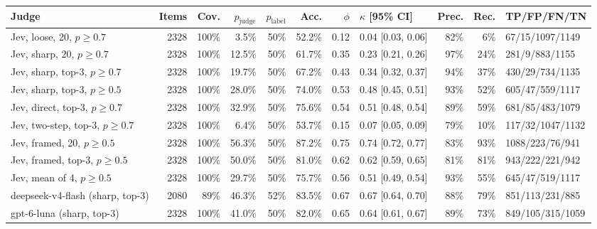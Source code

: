 \begin{tabular}{@{}lrrrrrrlrrl@{}}
\toprule
Judge & Items & Cov. & $p_{\text{judge}}$ & $p_{\text{label}}$ & Acc. & $\phi$ & $\kappa$ [95\% CI] & Prec. & Rec. & TP/FP/FN/TN \\
\midrule
Jev, loose, 20, $p \geq 0.7$ & 2328 & 100\% & 3.5\% & 50\% & 52.2\% & 0.12 & 0.04 [0.03, 0.06] & 82\% & 6\% & 67/15/1097/1149 \\
Jev, sharp, 20, $p \geq 0.7$ & 2328 & 100\% & 12.5\% & 50\% & 61.7\% & 0.35 & 0.23 [0.21, 0.26] & 97\% & 24\% & 281/9/883/1155 \\
Jev, sharp, top-3, $p \geq 0.7$ & 2328 & 100\% & 19.7\% & 50\% & 67.2\% & 0.43 & 0.34 [0.32, 0.37] & 94\% & 37\% & 430/29/734/1135 \\
Jev, sharp, top-3, $p \geq 0.5$ & 2328 & 100\% & 28.0\% & 50\% & 74.0\% & 0.53 & 0.48 [0.45, 0.51] & 93\% & 52\% & 605/47/559/1117 \\
Jev, direct, top-3, $p \geq 0.7$ & 2328 & 100\% & 32.9\% & 50\% & 75.6\% & 0.54 & 0.51 [0.48, 0.54] & 89\% & 59\% & 681/85/483/1079 \\
Jev, two-step, top-3, $p \geq 0.7$ & 2328 & 100\% & 6.4\% & 50\% & 53.7\% & 0.15 & 0.07 [0.05, 0.09] & 79\% & 10\% & 117/32/1047/1132 \\
Jev, framed, 20, $p \geq 0.5$ & 2328 & 100\% & 56.3\% & 50\% & 87.2\% & 0.75 & 0.74 [0.72, 0.77] & 83\% & 93\% & 1088/223/76/941 \\
Jev, framed, top-3, $p \geq 0.5$ & 2328 & 100\% & 50.0\% & 50\% & 81.0\% & 0.62 & 0.62 [0.59, 0.65] & 81\% & 81\% & 943/222/221/942 \\
Jev, mean of 4, $p \geq 0.5$ & 2328 & 100\% & 29.7\% & 50\% & 75.7\% & 0.56 & 0.51 [0.49, 0.54] & 93\% & 55\% & 645/47/519/1117 \\
deepseek-v4-flash (sharp, top-3) & 2080 & 89\% & 46.3\% & 52\% & 83.5\% & 0.67 & 0.67 [0.64, 0.70] & 88\% & 79\% & 851/113/231/885 \\
gpt-6-luna (sharp, top-3) & 2328 & 100\% & 41.0\% & 50\% & 82.0\% & 0.65 & 0.64 [0.61, 0.67] & 89\% & 73\% & 849/105/315/1059 \\
\bottomrule
\end{tabular}
